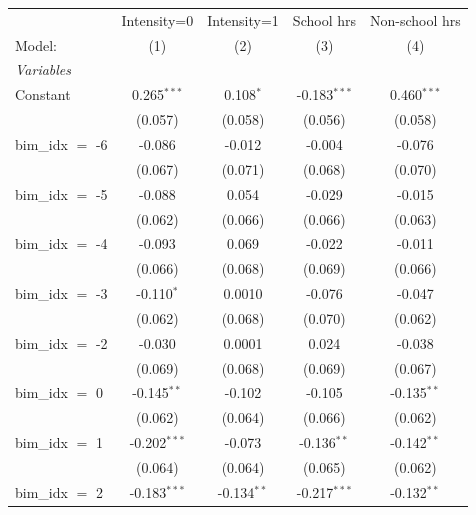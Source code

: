 
\begingroup
\centering
\begin{tabular}{lcccc}
   \tabularnewline \midrule \midrule
                       & Intensity=0    & Intensity=1    & School hrs     & Non-school hrs \\   
   Model:              & (1)            & (2)            & (3)            & (4)\\  
   \midrule
   \emph{Variables}\\
   Constant            & 0.265$^{***}$  & 0.108$^{*}$    & -0.183$^{***}$ & 0.460$^{***}$\\   
                       & (0.057)        & (0.058)        & (0.056)        & (0.058)\\   
   bim\_idx $=$ -6     & -0.086         & -0.012         & -0.004         & -0.076\\   
                       & (0.067)        & (0.071)        & (0.068)        & (0.070)\\   
   bim\_idx $=$ -5     & -0.088         & 0.054          & -0.029         & -0.015\\   
                       & (0.062)        & (0.066)        & (0.066)        & (0.063)\\   
   bim\_idx $=$ -4     & -0.093         & 0.069          & -0.022         & -0.011\\   
                       & (0.066)        & (0.068)        & (0.069)        & (0.066)\\   
   bim\_idx $=$ -3     & -0.110$^{*}$   & 0.0010         & -0.076         & -0.047\\   
                       & (0.062)        & (0.068)        & (0.070)        & (0.062)\\   
   bim\_idx $=$ -2     & -0.030         & 0.0001         & 0.024          & -0.038\\   
                       & (0.069)        & (0.068)        & (0.069)        & (0.067)\\   
   bim\_idx $=$ 0      & -0.145$^{**}$  & -0.102         & -0.105         & -0.135$^{**}$\\   
                       & (0.062)        & (0.064)        & (0.066)        & (0.062)\\   
   bim\_idx $=$ 1      & -0.202$^{***}$ & -0.073         & -0.136$^{**}$  & -0.142$^{**}$\\   
                       & (0.064)        & (0.064)        & (0.065)        & (0.062)\\   
   bim\_idx $=$ 2      & -0.183$^{***}$ & -0.134$^{**}$  & -0.217$^{***}$ & -0.132$^{**}$\\   

\end{tabular}
